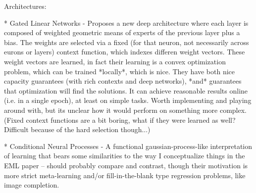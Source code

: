 Architectures:

* Gated Linear Networks - Proposes a new deep architecture where each layer is composed of weighted geometric means of experts of the previous layer plus a bias. The weights are selected via a fixed (for that neuron, not necessarily across eurons or layers) context function, which indexes differen weight vectors. These weight vectors are learned, in fact their learning is a convex optimization problem, which can be trained *locally*, which is nice. They have both nice capacity guarantees (with rich contexts and deep networks), *and* guarantees that optimization will find the solutions. It can achieve reasonable results online (i.e. in a single epoch), at least on simple tasks. Worth implementing and playing around with, but its unclear how it would perform on something more complex. (Fixed context functions are a bit boring, what if they were learned as well? Difficult because of the hard selection though...) \citep{Veness2017} 

* Conditional Neural Processes - A functional gaussian-process-like interpretation of learning that bears some similarities to the way I conceptualize things in the EML paper -- should probably compare and contrast, though their motivation is more strict meta-learning and/or fill-in-the-blank type regression problems, like image completion. \citep{Garnelo2018}


